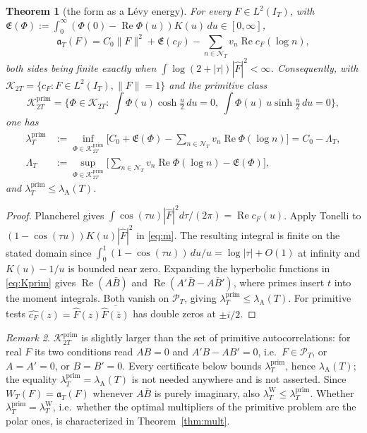 \documentclass[10pt]{amsart}
\newtheorem{theorem}{Theorem}[section]
\theoremstyle{definition}
\theoremstyle{remark}
\newtheorem{remark}[theorem]{Remark}
\newcommand{\Rel}{\operatorname{Re}}
\newcommand{\Kp}{\mathcal K^{\mathrm{prim}}_{2T}}
\newcommand{\Kw}{\mathcal K_{2T}}
\newcommand{\PT}{\mathcal P_T}
\newcommand{\IT}{I_T}
\newcommand{\lamP}{\lambda^{\mathrm{prim}}_T}
\newcommand{\lamW}{\lambda^{\mathrm W}_T}
\newcommand{\lamA}{\lambda_{\mathrm A}(T)}
\newcommand{\Fh}{\widehat F}
\newcommand{\cF}{c_F}
\newcommand{\Lev}{\mathfrak E}
\newcommand{\NT}{\mathcal N_T}
\begin{document}
\begin{theorem}[the form as a L\'evy energy]\label{thm:A}
For every $F\in L^2(\IT)$, with $\Lev(\Phi):=\int_0^\infty(\Phi(0)-\Rel\Phi(u))K(u)\,du\in[0,\infty]$,
\begin{equation}\label{eq:Aform}
\mathfrak a_T(F)=C_0\|F\|^2+\Lev(\cF)-\sum_{n\in\NT}v_n\Rel\cF(\log n),
\end{equation}
both sides being finite exactly when $\int\log(2+|\tau|)|\Fh|^2<\infty$. Consequently, with
$\Kw=\{\cF:F\in L^2(\IT),\|F\|=1\}$ and the primitive class
\begin{equation}\label{eq:Kprim}
\Kp=\Big\{\Phi\in\Kw:\ \int\Phi(u)\cosh\tfrac u2\,du=0,\ \int\Phi(u)\,u\sinh\tfrac u2\,du=0\Big\},
\end{equation}
one has
\begin{align*}
\lamP&:=\inf_{\Phi\in\Kp}\Big[C_0+\Lev(\Phi)-\sum_{n\in\NT}v_n\Rel\Phi(\log n)\Big]=C_0-\Lambda_T,\\
\Lambda_T&:=\sup_{\Phi\in\Kp}\Big[\sum_{n\in\NT}v_n\Rel\Phi(\log n)-\Lev(\Phi)\Big],
\end{align*}
and $\lamP\le\lamA$.
\end{theorem}
\begin{proof}
Plancherel gives $\int\cos(\tau u)|\Fh|^2d\tau/(2\pi)=\Rel\cF(u)$.
Apply Tonelli to $(1-\cos(\tau u))K(u)|\Fh|^2$ in \eqref{eq:m}.
The resulting integral is finite on the stated domain since
$\int_0^1(1-\cos(\tau u))\,du/u=\log|\tau|+O(1)$ at infinity and
$K(u)-1/u$ is bounded near zero. Expanding the hyperbolic functions
in \eqref{eq:Kprim} gives $\Rel(A\bar B)$ and
$\Rel(A'\bar B-A\bar B')$, where primes insert $t$ into the moment
integrals. Both vanish on $\PT$, giving $\lamP\le\lamA$. For primitive
tests $\widehat{\cF}(z)=\widehat F(z)\overline{\widehat F(\bar z)}$
has double zeros at $\pm i/2$.
\end{proof}

\begin{remark}\label{rem:Kprim}
$\Kp$ is slightly larger than the set of primitive autocorrelations: for real $F$ its two
conditions read $AB=0$ and $A'B-AB'=0$, i.e.\ $F\in\PT$, or $A=A'=0$, or $B=B'=0$. Every
certificate below bounds $\lamP$, hence $\lamA$; the equality $\lamP=\lamA$ is not needed
anywhere and is not asserted. Since $W_T(F)=\mathfrak a_T(F)$ whenever $A\bar B$ is purely
imaginary, also $\lamW\le\lamP$. Whether $\lamP=\lamW$, i.e.\ whether the optimal multipliers of the
primitive problem are the polar ones, is characterized in Theorem~\ref{thm:mult}.
\end{remark}
\end{document}
